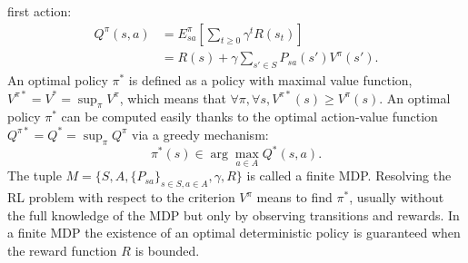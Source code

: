 \documentclass[tablecaption=bottom]{jmlr}
\begin{document}
first action:
%
\begin{align}
\label{Qdef.eqn} Q^\pi(s,a) & =
E^\pi_{sa}[\sum_{t\geq0}\gamma^tR(s_t)]\\
& = R(s) + \gamma\sum_{s'\in S}P_{sa}(s') V^\pi(s').
\end{align}
%
%
%
An optimal policy $\pi^*$ is defined as a policy with maximal value
function, $V^{\pi*}=V^*=\sup_{\pi}V^{\pi}$, which means that
$\forall \pi, \forall s, V^{\pi*}(s) \geq V^\pi(s)$. An optimal
policy $\pi^*$ can be computed easily thanks to the optimal
action-value function $Q^{\pi*}=Q^*=\sup_{\pi}Q^\pi$ via a greedy
mechanism:
%
\begin{equation}
\label{greedy.eqn} \pi^*(s) \in \arg\max_{a\in A} Q^*(s,a).
\end{equation}
%
The tuple $M=\{S,A,\{P_{sa}\}_{s\in S,a\in A},\gamma,R\}$ is called
a finite MDP. Resolving the RL problem with respect to the criterion
$V^\pi$  means to find $\pi^*$, usually without the full knowledge
of the MDP but only by observing transitions and rewards. In a
finite MDP the existence of an optimal deterministic policy is
guaranteed when the reward function $R$ is bounded.
%
\end{document}
